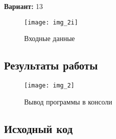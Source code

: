 {\bfseries Вариант:} 13

\begin{figure}[h!]
\centering
\texttt{[image: img\_2i]}
\caption{Входные данные}
\end{figure}

\subsection{Результаты работы}
\begin{figure}[h!]
\centering
\texttt{[image: img\_2]}
\caption{Вывод программы в консоли}
\end{figure}

\pagebreak

\subsection{Исходный код}


